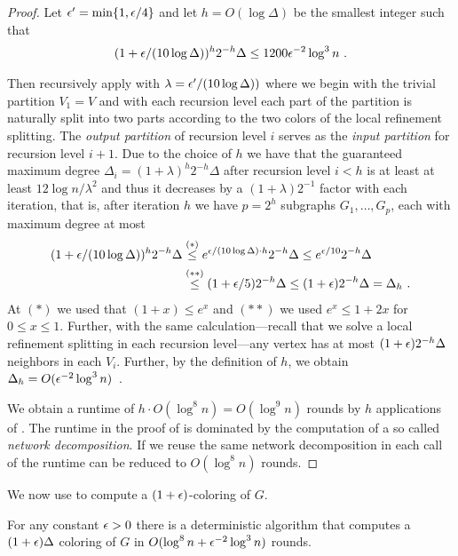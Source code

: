 \begin{proof}
Let $\epsilon'=\min\{1,\epsilon/4\}$ and let $h=O(\log \Delta)$ be the smallest integer such that \begin{align}
(1+\epsilon/(10\log \Delta))^h2^{-h}\Delta\leq 1200\epsilon^{-2} \log^3 n~.
\end{align}

Then recursively apply  with $\lambda=\epsilon'/(10\log \Delta))$ where we begin with the trivial partition $V_1=V$ and with each recursion level each part of the partition is naturally split into two parts according to the two colors of the local refinement splitting. The \emph{output partition} of recursion level $i$ serves as the \emph{input partition} for recursion level $i+1$. 
 Due to the choice of $h$ we have that the guaranteed maximum degree $\Delta_i=(1+\lambda)^h2^{-h}\Delta$ after recursion level $i< h$ is at least at least $12\log n /\lambda^{2}$ and thus it decreases by a $(1+\lambda)2^{-1}$ factor with each iteration, that is, after iteration $h$ we have $p=2^h$ subgraphs $G_1,\ldots,G_p$, each with maximum degree at most  
\begin{align}
(1+\epsilon/(10\log \Delta))^h2^{-h}\Delta & \stackrel{(*)}{\leq} e^{\epsilon/(10\log \Delta)\cdot h}2^{-h}\Delta\leq e^{\epsilon/10}2^{-h}\Delta\\
& \stackrel{(**)}{\leq} (1+\epsilon/5)2^{-h}\Delta\leq (1+\epsilon)2^{-h}\Delta=\Delta_h~.
\end{align}
At $(*)$ we used that $(1+x)\leq e^x$ and $(**)$ we used $e^x\leq 1+2x$ for $0\leq x\leq 1$. 
Further, with the same calculation---recall that we solve a local refinement splitting in each recursion level---any vertex has at most $(1+\epsilon)2^{-h}\Delta$ neighbors in each $V_i$. 
Further, by the definition of $h$, we obtain $\Delta_h=O(\epsilon^{-2}\log^3 n)$~.

We obtain a runtime of $h\cdot O(\log^8 n)=O(\log^9 n)$ rounds  by $h$ applications of . The runtime in the proof of  is dominated by the computation of a so called \emph{network decomposition}. If we reuse the same network decomposition in each call of  the runtime can be reduced to $O(\log^8 n)$ rounds. 
\end{proof}
We now use  to compute a $(1+\epsilon)$-coloring of $G$. 
\begin{theorem}
\label{thm:coloringWithSplitting}
For any constant $\epsilon>0$ there is a deterministic {\congest} algorithm that computes a $(1+\epsilon)\Delta$ coloring of $G$ in $O(\log^8 n+\epsilon^{-2}\log^3 n)$ rounds.
\end{theorem}
